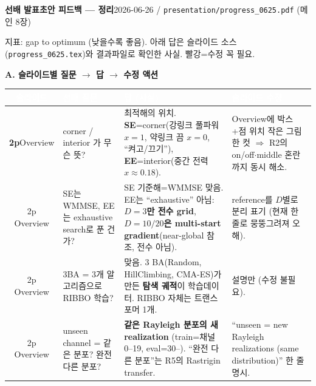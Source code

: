 \documentclass[10pt]{article}
\begin{document}
\footnotesize

{\Large\bfseries 선배 발표초안 피드백 — 정리}\hfill {\small 2026-06-26 \;/\; \texttt{presentation/progress\_0625.pdf} (메인 8장)}

\vspace{2pt}
{\small 지표: gap to optimum (낮을수록 좋음). 아래 답은 슬라이드 소스(\texttt{progress\_0625.tex})와 결과파일로 확인한 사실. \textcolor{flag}{빨강}=수정 꼭 필요.}

\vspace{6pt}
{\large\bfseries\color{hdr} A. 슬라이드별 질문 $\to$ 답 $\to$ 수정 액션}
\vspace{3pt}

\begin{longtable}{S Q A F}
\toprule
{}
\textcolor{white}{\bfseries 슬라이드} & \textcolor{white}{\bfseries 선배 질문} & \textcolor{white}{\bfseries 답 (사실)} & \textcolor{white}{\bfseries 슬라이드 수정} \\
\midrule
\endhead

\textbf{2p}\newline Overview & corner / interior 가 무슨 뜻? & 최적해의 위치. \textbf{SE}=corner(강링크 풀파워 $x{=}1$, 약링크 끔 $x{=}0$, ``켜고/끄기''), \textbf{EE}=interior(중간 전력 $x\approx0.18$). & Overview에 박스+점 위치 작은 그림 한 컷 $\Rightarrow$ R2의 on/off$\cdot$middle 혼란까지 동시 해소. \\
2p Overview & SE는 WMMSE, EE는 exhaustive search로 푼 건가? & SE 기준해=WMMSE 맞음. EE는 ``exhaustive'' 아님: \textbf{$D{=}3$만 전수 grid}, \textbf{$D{=}10/20$은 multi-start gradient}(near-global 참조, 전수 아님). & \textcolor{flag}{reference를 $D$별로 분리 표기} (현재 한 줄로 뭉뚱그려져 오해). \\
2p Overview & 3BA = 3개 알고리즘으로 RIBBO 학습? & 맞음. 3 BA(Random, HillClimbing, CMA-ES)가 만든 \textbf{탐색 궤적}이 학습데이터. RIBBO 자체는 트랜스포머 1개. & 설명만 (수정 불필요). \\
2p Overview & unseen channel = 같은 분포? 완전 다른 분포? & \textbf{같은 Rayleigh 분포의 새 realization} (train=채널 0--19, eval=30--). ``완전 다른 분포''는 R5의 Rastrigin transfer. & ``unseen = new Rayleigh realizations (same distribution)'' 한 줄 명시. \\
\midrule


\end{longtable}
\end{document}
